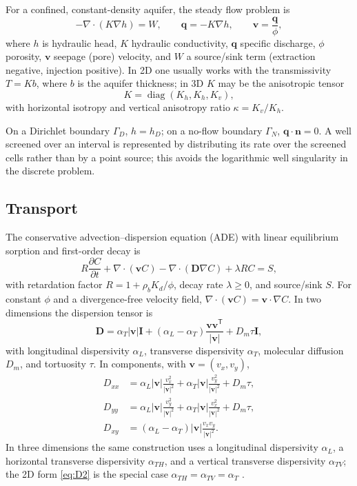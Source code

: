 \documentclass[11pt]{article}
\newcommand{\pdd}[2]{\frac{\partial #1}{\partial #2}}
\newcommand{\DD}{\mathbf{D}}
\newcommand{\vv}{\mathbf{v}}
\newcommand{\nn}{\mathbf{n}}
\newcommand{\abs}[1]{\left\lvert #1 \right\rvert}
\newcommand{\T}{\mathsf{T}}
\begin{document}
For a confined, constant-density aquifer, the steady flow problem is
\begin{equation}
\label{eq:flow}
-\nabla\cdot(K\nabla h)=W,
\qquad
\mathbf{q}=-K\nabla h,
\qquad
\vv=\frac{\mathbf{q}}{\phi},
\end{equation}
where $h$ is hydraulic head, $K$ hydraulic conductivity, $\mathbf{q}$ specific
discharge, $\phi$ porosity, $\vv$ seepage (pore) velocity, and $W$ a
source/sink term (extraction negative, injection positive).  In 2D one usually
works with the transmissivity $T=Kb$, where $b$ is the aquifer thickness; in 3D
$K$ may be the anisotropic tensor
\begin{equation}
\label{eq:Kaniso}
K=\operatorname{diag}(K_h,K_h,K_v),
\end{equation}
with horizontal isotropy and vertical anisotropy ratio $\kappa=K_v/K_h$.

On a Dirichlet boundary $\Gamma_D$, $h=h_D$; on a no-flow boundary
$\Gamma_N$, $\mathbf{q}\cdot\nn=0$.  A well screened over an interval is
represented by distributing its rate over the screened cells rather than by a
point source; this avoids the logarithmic well singularity in the discrete
problem.

\subsection{Transport}

The conservative advection--dispersion equation (ADE) with linear equilibrium
sorption and first-order decay is
\begin{equation}
\label{eq:ade}
R\pdd{C}{t}+\nabla\cdot(\vv C)-\nabla\cdot(\DD\nabla C)+\lambda R C=S,
\end{equation}
with retardation factor $R=1+\rho_bK_d/\phi$, decay rate $\lambda\ge0$, and
source/sink $S$.  For constant $\phi$ and a divergence-free velocity field,
$\nabla\cdot(\vv C)=\vv\cdot\nabla C$.  In two dimensions the dispersion
tensor is
\begin{equation}
\label{eq:D2}
\DD=\alpha_T\abs{\vv}\mathbf{I}
+(\alpha_L-\alpha_T)\frac{\vv\vv^{\T}}{\abs{\vv}}
+D_m\tau\mathbf{I},
\end{equation}
with longitudinal dispersivity $\alpha_L$, transverse dispersivity $\alpha_T$,
molecular diffusion $D_m$, and tortuosity $\tau$.  In components, with
$\vv=(v_x,v_y)$,
\begin{equation}
\label{eq:D2comp}
\begin{aligned}
D_{xx}&=\alpha_L\abs{\vv}\frac{v_x^2}{\abs{\vv}^2}
       +\alpha_T\abs{\vv}\frac{v_y^2}{\abs{\vv}^2}+D_m\tau,\\
D_{yy}&=\alpha_L\abs{\vv}\frac{v_y^2}{\abs{\vv}^2}
       +\alpha_T\abs{\vv}\frac{v_x^2}{\abs{\vv}^2}+D_m\tau,\\
D_{xy}&=(\alpha_L-\alpha_T)\abs{\vv}\frac{v_xv_y}{\abs{\vv}^2}.
\end{aligned}
\end{equation}
In three dimensions the same construction uses a longitudinal dispersivity
$\alpha_L$, a horizontal transverse dispersivity $\alpha_{TH}$, and a vertical
transverse dispersivity $\alpha_{TV}$; the 2D form \eqref{eq:D2} is the
special case $\alpha_{TH}=\alpha_{TV}=\alpha_T$ \citep{bear1972}.
\end{document}
